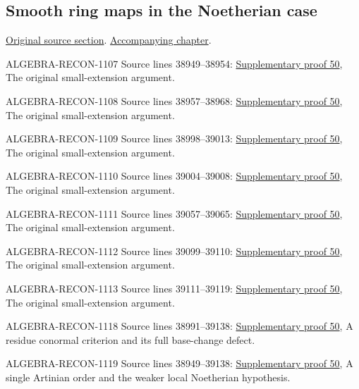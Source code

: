 \subsection{Smooth ring maps in the Noetherian case}
\hypertarget{algebra-source-section-smooth-Noetherian}{}
\noindent\href{https://github.com/stacks/stacks-project/blob/a04446e57ec1fbc252a871afcec7752fb2807b14/algebra.tex\#L38933}{Original source section}. \href{algebra.pdf\#nameddest=section-smooth-Noetherian}{Accompanying chapter}.

\begin{AlgebraSourceRoutes}
\item[ALGEBRA-RECON-1107] Source lines 38949--38954: \hyperlink{algebra_smooth_artin_notes_20260928}{Supplementary proof 50}, The original small-extension argument.
\item[ALGEBRA-RECON-1108] Source lines 38957--38968: \hyperlink{algebra_smooth_artin_notes_20260928}{Supplementary proof 50}, The original small-extension argument.
\item[ALGEBRA-RECON-1109] Source lines 38998--39013: \hyperlink{algebra_smooth_artin_notes_20260928}{Supplementary proof 50}, The original small-extension argument.
\item[ALGEBRA-RECON-1110] Source lines 39004--39008: \hyperlink{algebra_smooth_artin_notes_20260928}{Supplementary proof 50}, The original small-extension argument.
\item[ALGEBRA-RECON-1111] Source lines 39057--39065: \hyperlink{algebra_smooth_artin_notes_20260928}{Supplementary proof 50}, The original small-extension argument.
\item[ALGEBRA-RECON-1112] Source lines 39099--39110: \hyperlink{algebra_smooth_artin_notes_20260928}{Supplementary proof 50}, The original small-extension argument.
\item[ALGEBRA-RECON-1113] Source lines 39111--39119: \hyperlink{algebra_smooth_artin_notes_20260928}{Supplementary proof 50}, The original small-extension argument.
\item[ALGEBRA-RECON-1118] Source lines 38991--39138: \hyperlink{algebra_smooth_artin_notes_20260928}{Supplementary proof 50}, A residue conormal criterion and its full base-change defect.
\item[ALGEBRA-RECON-1119] Source lines 38949--39138: \hyperlink{algebra_smooth_artin_notes_20260928}{Supplementary proof 50}, A single Artinian order and the weaker local Noetherian hypothesis.
\end{AlgebraSourceRoutes}

